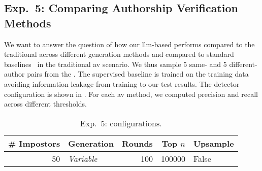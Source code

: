 \subsection{Exp.\ 5: Comparing Authorship Verification Methods}%
\label{subsec:imp_gen}

We want to answer the question of how our \ac{llm}-based \impAppr{} performs compared to the traditional \impAppr{} across different generation methods and compared to standard baselines~\citep{koppel_determining_2014} %
in the traditional \ac{av} scenario.
We thus sample 5 same- and 5 different-author pairs from the \dataStudent{}. %
The supervised baseline is trained on the training data avoiding information leakage from training to our test results.
The \impAppr{} 
detector configuration is shown in . %
For each \ac{av} method, we computed precision and recall across different thresholds. 

\begin{table}[h]
\centering\small
\caption{Exp.\ 5: \impAppr{} configurations.}
\label{tab:exp5_imp_config}
\begin{tabular}{@{}rlrrl@{}}   %
\toprule
\# Impostors & Generation & Rounds & Top $n$ & Upsample \\
\midrule
50 & \textit{Variable} & 100 & \num{100000} & False \\
\bottomrule
\end{tabular}%
\end{table}



